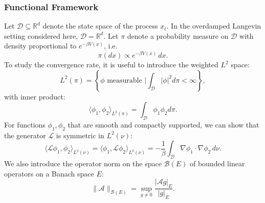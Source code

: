 \documentclass[11pt, twoside]{report}
\begin{document}
\subsubsection{Functional Framework}
Let $\mathcal{D} \subseteq \mathbb{R}^d$ denote the state space of the process $x_t$. In the overdamped Langevin setting considered here, $\mathcal{D} = \mathbb{R}^d$. Let $\pi$ denote a probability measure on $\mathcal{D}$ with density proportional to
$e^{-\beta V(x)}$, i.e.
\[
\pi(dx) \propto e^{-\beta V(x)}\,dx .
\]
To study the convergence rate, it is useful to introduce the weighted $L^2$ space:
\begin{equation} \label{weightedL2}
    L^2(\pi) = \left\{\phi \text{ measurable } \bigg| \int_\mathcal{D} |\phi|^2 d\pi < \infty  \right\},
\end{equation}
with inner product:
\begin{equation*}
\langle \phi_1, \phi_2 \rangle_{L^2(\pi)} = \int_\mathcal{D} \phi_1 \phi_2 d\pi.
\end{equation*}
For functions $\phi_1, \phi_2$ that are smooth and compactly supported, we can show that the generator $\mathcal{L}$ is symmetric in $L^2(\nu)$:
\begin{equation}
\langle \mathcal{L} \phi_1, \phi_2 \rangle_{L^2(\nu)} = \langle \phi_1, \mathcal{L} \phi_2 \rangle_{L^2(\nu)} = -\frac{1}{\beta} \int_\mathcal{D} \nabla \phi_1 \cdot \nabla \phi_2 \, d\nu.
\end{equation}
We also introduce the operator norm on the space $\mathcal{B}(E)$ of bounded linear operators on a Banach space $E$:
\begin{equation}
\|\mathcal{A}\|_{\mathcal{B}(E)} = \sup_{g \neq 0} \frac{|\mathcal{A} g|_E}{|g|_E}.
\end{equation}

\end{document}
